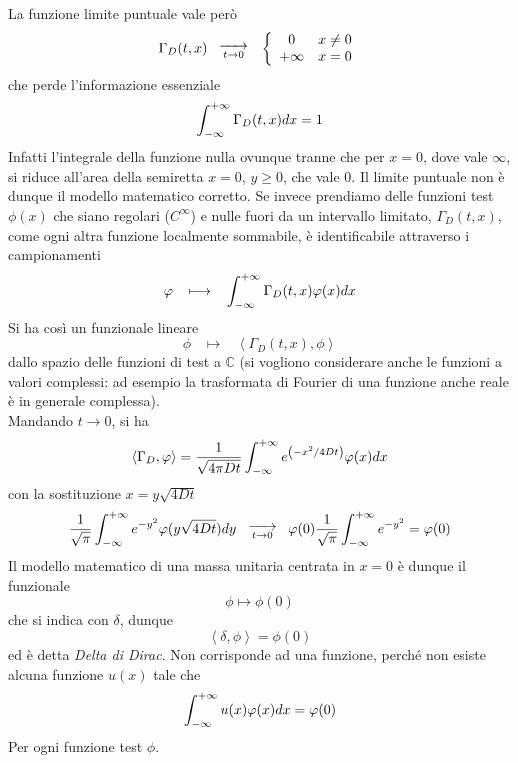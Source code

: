 \noindent
La funzione limite puntuale vale per\`o
\[
	\Gamma_D(t,x)
	\;\;\;
	\substack{\xrightarrow{\hspace*{5mm}} \\ t\rightarrow 0}
	\;\;\;
	\left\{
		\begin{array}{cl}
			0 		& x \neq 0 \\
			+ \infty	& x= 0 \\
		\end{array}
	\right.
\]
che perde l'informazione essenziale
\[
	\int_{- \infty}^{+ \infty} \Gamma_D(t,x) dx= 1
\]
Infatti l'integrale della funzione nulla ovunque tranne che per $x=0$, dove vale
$\infty$, si riduce all'area della semiretta $x=0$, $y\geq 0$, che vale
0. Il limite puntuale non \`e dunque il modello matematico corretto.
Se invece prendiamo delle funzioni test $\phi (x)$ che siano regolari
($C^\infty$) e nulle fuori da un intervallo limitato, $\Gamma_D(t,x)$,
come ogni altra funzione localmente sommabile, \`e identificabile attraverso
i campionamenti
\[
	\varphi \;\;\; \longmapsto \;\;\;
	\int_{- \infty}^{+ \infty} \Gamma_D(t,x) \varphi(x) dx
\]
Si ha cos\`i un funzionale lineare
\[
	\phi \;\;\; \longmapsto \;\;\;
	\left< \Gamma_D(t,x), \phi \right>
\]
dallo spazio delle funzioni di test a $\mathbb{C}$ (si vogliono considerare
anche le funzioni a valori complessi: ad esempio la trasformata di Fourier di
una funzione anche reale \`e in generale complessa).\\
Mandando $t \to 0$, si ha
\[
	\left< \Gamma_D, \varphi \right>=
	\frac{1}{\sqrt{4 \pi D t}} \int_{- \infty}^{+ \infty}
	e^{\left( -x^2/4Dt \right)}
	\varphi (x) dx
\]
con la sostituzione $x= y \sqrt{4Dt}$
\[
	\frac{1}{\sqrt{\pi}} \int_{- \infty}^{+ \infty}
	e^{-y^2}\varphi (y\sqrt{4Dt}) dy
	\;\;\;
	\substack{\xrightarrow{\hspace*{5mm}} \\ t\rightarrow 0}
	\;\;\;
	\varphi(0)\frac{1}{\sqrt{\pi}}
	\int_{- \infty}^{+ \infty} e^{-y^2}= \varphi(0)
\]
Il modello matematico di una massa unitaria centrata in $x=0$ \`e dunque
il funzionale
\[
	\phi \longmapsto \phi(0)
\]
che si indica con $\delta$, dunque
\[
	\left< \delta, \phi \right> = \phi(0)
\]
ed \`e detta \textit{Delta di Dirac}.
Non corrisponde ad una funzione, perch\'e non esiste alcuna funzione $u(x)$
tale che
\[
	\int_{- \infty}^{+ \infty} u(x)\varphi(x)dx= \varphi (0)
\]
Per ogni funzione test $\phi$.

